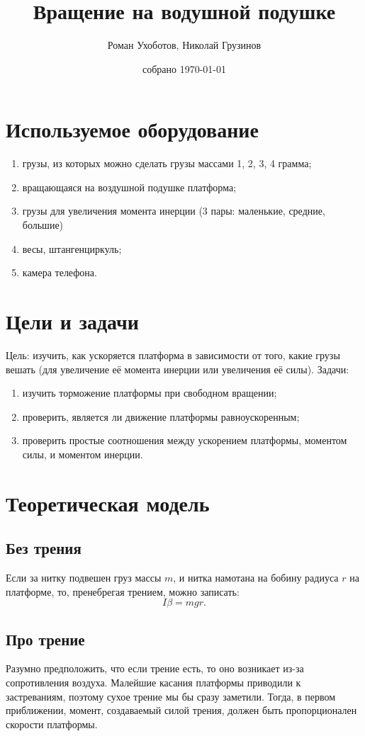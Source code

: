 \documentclass[a4paper, 12pt]{article}
\title{Вращение на водушной подушке}
\author{Роман Ухоботов, Николай Грузинов}
\date{собрано \today}
\begin{document}
\maketitle

\section{Используемое оборудование}
\begin{enumerate}
\item грузы, из которых можно сделать грузы массами 1, 2, 3, 4 грамма;
\item вращающаяся на воздушной подушке платформа;
\item грузы для увеличения момента инерции (3 пары: маленькие, средние, большие)
\item весы, штангенциркуль;
\item камера телефона.
\end{enumerate}

\section{Цели и задачи}
Цель: изучить, как ускоряется платформа в зависимости от того, какие грузы вешать (для увеличение её момента инерции или увеличения её силы).
Задачи:
\begin{enumerate}
\item изучить торможение платформы при свободном вращении;
\item проверить, является ли движение платформы равноускоренным;
\item проверить простые соотношения между ускорением платформы, моментом силы, и моментом инерции.
\end{enumerate}

\section{Теоретическая модель}

\subsection{Без трения}
Если за нитку подвешен груз массы $m$, и нитка намотана на бобину радиуса $r$ на платформе, то, пренебрегая трением, можно записать:
\[ I \beta = mgr .\]

\subsection{Про трение}
Разумно предположить, что если трение есть, то оно возникает из-за сопротивления воздуха.
Малейшие касания платформы приводили к застреваниям, поэтому сухое трение мы бы сразу заметили.
Тогда, в первом приближении, момент, создаваемый силой трения, должен быть пропорционален скорости платформы.
\end{document}
